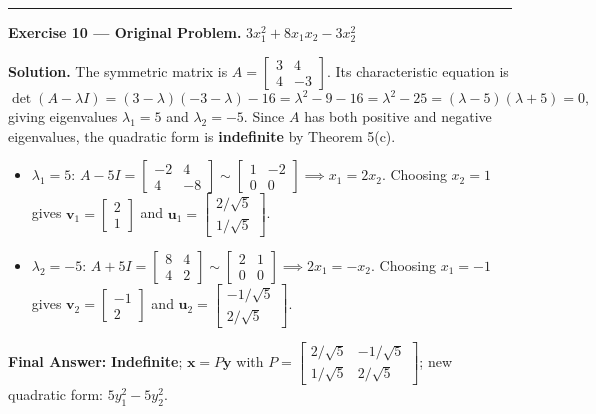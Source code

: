 \documentclass[11pt, letterpaper]{article}
\theoremstyle{definition}
\theoremstyle{remark}
\begin{document}
\medskip
\hrule
\medskip

\textbf{Exercise 10 --- Original Problem.} $3x_1^2 + 8x_1x_2 - 3x_2^2$

\textbf{Solution.}
The symmetric matrix is $A = \begin{bmatrix} 3 & 4 \\ 4 & -3 \end{bmatrix}$. Its characteristic equation is
\[
\det(A - \lambda I) = (3 - \lambda)(-3 - \lambda) - 16 = \lambda^2 - 9 - 16 = \lambda^2 - 25 = (\lambda - 5)(\lambda + 5) = 0,
\]
giving eigenvalues $\lambda_1 = 5$ and $\lambda_2 = -5$. Since $A$ has both positive and negative eigenvalues, the quadratic form is \textbf{indefinite} by Theorem 5(c).
\begin{itemize}
    \item $\lambda_1 = 5$: $A - 5I = \begin{bmatrix} -2 & 4 \\ 4 & -8 \end{bmatrix} \sim \begin{bmatrix} 1 & -2 \\ 0 & 0 \end{bmatrix} \implies x_1 = 2x_2$. Choosing $x_2 = 1$ gives $\mathbf{v}_1 = \begin{bmatrix} 2 \\ 1 \end{bmatrix}$ and $\mathbf{u}_1 = \begin{bmatrix} 2/\sqrt{5} \\ 1/\sqrt{5} \end{bmatrix}$.
    \item $\lambda_2 = -5$: $A + 5I = \begin{bmatrix} 8 & 4 \\ 4 & 2 \end{bmatrix} \sim \begin{bmatrix} 2 & 1 \\ 0 & 0 \end{bmatrix} \implies 2x_1 = -x_2$. Choosing $x_1 = -1$ gives $\mathbf{v}_2 = \begin{bmatrix} -1 \\ 2 \end{bmatrix}$ and $\mathbf{u}_2 = \begin{bmatrix} -1/\sqrt{5} \\ 2/\sqrt{5} \end{bmatrix}$.
\end{itemize}

\textbf{Final Answer:} \textbf{Indefinite}; $\mathbf{x} = P\mathbf{y}$ with $P = \begin{bmatrix} 2/\sqrt{5} & -1/\sqrt{5} \\ 1/\sqrt{5} & 2/\sqrt{5} \end{bmatrix}$; new quadratic form: $5y_1^2 - 5y_2^2$.
\end{document}
